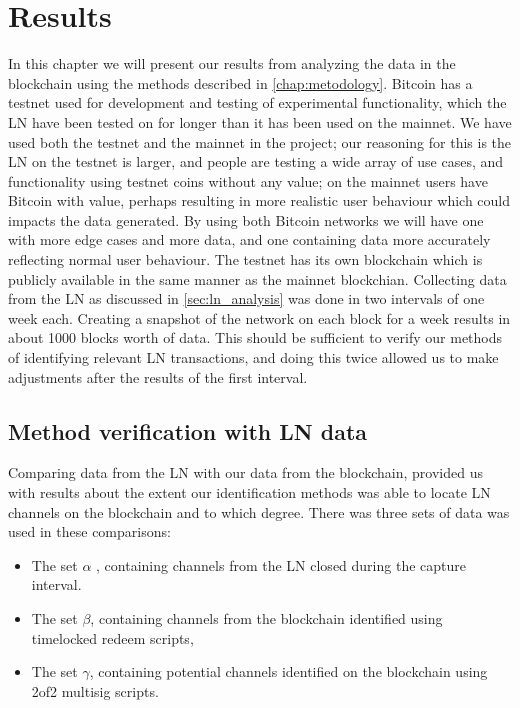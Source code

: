 \chapter{Results}
\label{chap:results}

In this chapter we will present our results from analyzing the data in the blockchain using the methods described in \cref{chap:metodology}.
Bitcoin has a testnet used for development and testing of experimental functionality, which the LN have been tested on for longer than it has been used on the mainnet. We have used both the testnet and the mainnet in the project; our reasoning for this is the LN on the testnet is larger, and people are testing a wide array of use cases, and functionality using testnet coins without any value; on the mainnet users have Bitcoin with value, perhaps resulting in more realistic user behaviour which could impacts the data generated.
By using both Bitcoin networks we will have one with more edge cases and more data, and one containing data more accurately reflecting normal user behaviour.
The testnet has its own blockchain which is publicly available in the same manner as the mainnet blockchian. Collecting data from the LN as discussed in \cref{sec:ln_analysis} was done in two intervals of one week each. Creating a snapshot of the network on each block for a week results in about 1000 blocks worth of data. This should be sufficient to verify our methods of identifying relevant LN transactions, and doing this twice allowed us to make adjustments after the results of the first interval.

\section{Method verification with LN data}

Comparing data from the LN with our data from the blockchain, provided us with results about the extent our identification methods was able to locate LN channels on the blockchain and to which degree. There was three sets of data was used in these comparisons: 
\begin{itemize}
    \item The set \( \alpha \) , containing channels from the LN closed during the capture interval. 
    \item The set \( \beta \), containing channels from the blockchain identified using timelocked redeem scripts,
    \item The set  \( \gamma \), containing potential channels identified on the blockchain using 2of2 multisig scripts.
\end{itemize}


